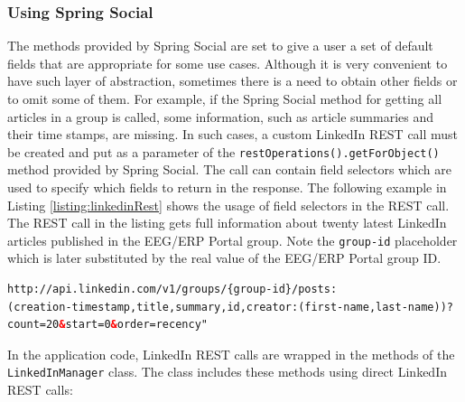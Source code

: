 \subsubsection{Using Spring Social}

The methods provided by Spring Social are set to give a user a set of default fields that are appropriate for some use cases. 
Although it is very convenient to have such layer of abstraction, sometimes there is a need to obtain other fields or to omit some of them. 
For example, if the Spring Social method for getting all articles in a group is called, some information, such as article summaries and their time stamps, are missing. 
In such cases, a custom LinkedIn REST call must be created and put as a parameter of the \texttt{restOperations().getForObject()} method provided by Spring Social.
The call can contain field selectors which are used to specify which fields to return in the response.
The following example in Listing \ref{listing:linkedinRest} shows the usage of field selectors in the REST call.
The REST call in the listing gets full information about twenty latest LinkedIn articles published in the EEG/ERP Portal group.
Note the \texttt{{group-id}} placeholder which is later substituted by the real value of the EEG/ERP Portal group ID.


\begin{lstlisting}[language=HTML, caption={Example of a LinkedIn REST API call.}, label={listing:linkedinRest}]
http://api.linkedin.com/v1/groups/{group-id}/posts:
(creation-timestamp,title,summary,id,creator:(first-name,last-name))?
count=20&start=0&order=recency"

\end{lstlisting}

In the application code, LinkedIn REST calls are wrapped in the methods of the \texttt{LinkedInManager} class. The class includes these methods using direct LinkedIn REST calls:

